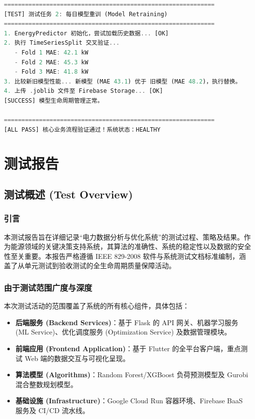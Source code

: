\begin{lstlisting}[style=codestyle, language=Dart, caption={建模与优化界面}]
============================================================
[TEST] 测试任务 2: 每日模型重训 (Model Retraining)
============================================================
1. EnergyPredictor 初始化，尝试加载历史数据... [OK]
2. 执行 TimeSeriesSplit 交叉验证...
   - Fold 1 MAE: 42.1 kW
   - Fold 2 MAE: 45.3 kW
   - Fold 3 MAE: 41.8 kW
3. 比较新旧模型性能... 新模型 (MAE 43.1) 优于 旧模型 (MAE 48.2)，执行替换。
4. 上传 .joblib 文件至 Firebase Storage... [OK]
[SUCCESS] 模型生命周期管理正常。

============================================================
[ALL PASS] 核心业务流程验证通过！系统状态：HEALTHY
\end{lstlisting}

\chapter{测试报告}

\section{测试概述 (Test Overview)}

\subsection{引言}
本测试报告旨在详细记录“电力数据分析与优化系统”的测试过程、策略及结果。作为能源领域的关键决策支持系统，其算法的准确性、系统的稳定性以及数据的安全性至关重要。本报告严格遵循 IEEE 829-2008 软件与系统测试文档标准编制，涵盖了从单元测试到验收测试的全生命周期质量保障活动。

\subsection{由于测试范围广度与深度}
本次测试活动的范围覆盖了系统的所有核心组件，具体包括：
\begin{itemize}
    \item \textbf{后端服务 (Backend Services)}：基于 Flask 的 API 网关、机器学习服务 (ML Service)、优化调度服务 (Optimization Service) 及数据管理模块。
    \item \textbf{前端应用 (Frontend Application)}：基于 Flutter 的全平台客户端，重点测试 Web 端的数据交互与可视化呈现。
    \item \textbf{算法模型 (Algorithms)}：Random Forest/XGBoost 负荷预测模型及 Gurobi 混合整数规划模型。
    \item \textbf{基础设施 (Infrastructure)}：Google Cloud Run 容器环境、Firebase BaaS 服务及 CI/CD 流水线。
\end{itemize}

